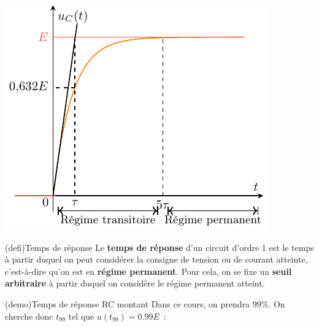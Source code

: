 \documentclass[../../main/main.tex]{subfiles}
\begin{document}
\begin{tcb*}[label=impl:déterm, sidebyside, righthand ratio=.4]
{    }{%
      \includegraphics[width=\linewidth]{carac_rc-tau}
    }%
  \end{tcb*}
\begin{tcb*}(defi){Temps de réponse}
  Le \textbf{temps de réponse} d'un circuit d'ordre 1 est le temps à partir
  duquel on peut considérer la consigne de tension ou de courant atteinte,
  c'est-à-dire qu'on est en \textbf{régime permanent}.
  \smallbreak
  Pour cela, on se fixe un \textbf{seuil arbitraire} à partir duquel on
  considère le régime permanent atteint. 
\end{tcb*}

\begin{tcb*}(demo){Temps de réponse RC montant}
Dans ce cours, on prendra $99\%$. On cherche donc $t_{99}$ tel que $u(t_{99}) =
\num{0.99}E$~:
  \vspace{-15pt}
\end{tcb*}
\end{document}
